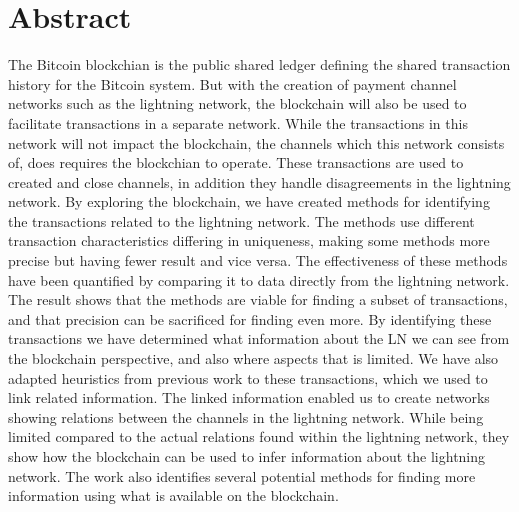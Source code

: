 \chapter*{Abstract}

The Bitcoin blockchian is the public shared ledger defining the shared transaction history for the Bitcoin system. But with the creation of payment channel networks such as the lightning network, the blockchain will also be used to facilitate transactions in a separate network. 
While the transactions in this network will not impact the blockchain, the channels which this network consists of, does requires the blockchian to operate. These transactions are used to created and close channels, in addition they handle disagreements in the lightning network.
By exploring the blockchain, we have created methods for identifying the transactions related to the lightning network. The methods use different transaction characteristics differing in uniqueness, making some methods more precise but having fewer result and vice versa.
The effectiveness of these methods have been quantified by comparing it to data directly from the lightning network. The result shows that the methods are viable for finding a subset of transactions, and that precision can be sacrificed for finding even more.
By identifying these transactions we have determined what information about the LN we can see from the blockchain perspective, and also where aspects that is limited. We have also adapted heuristics from previous work to these transactions, which we used to link related information. The linked information enabled us to create networks showing relations between the channels in the lightning network. 
While being limited compared to the actual relations found within the lightning network, they show how the blockchain can be used to infer information about the lightning network. The work also identifies several potential methods for finding more information using what is available on the blockchain.

\hypersetup{pageanchor=false}